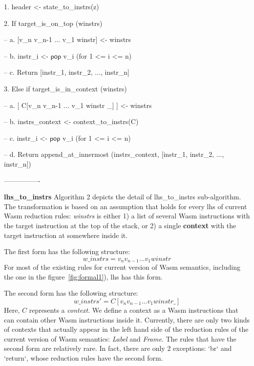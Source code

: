 1. header <- state\_to\_instrs(z)

2. If target\_is\_on\_top (winstrs)

-- a. [v\_n v\_n-1 ... v\_1 winstr] <- winstrs

-- b. instr\_i <- $\mathsf{pop}$ v\_i (for 1 <= i <= n)

-- c. Return [instr\_1, instr\_2, ..., instr\_n]

3. Else if target\_is\_in\_context (winstrs)

-- a. [ C[v\_n v\_n-1 ... v\_1 winstr \_] ] <- winstrs

-- b. instrs\_context <- context\_to\_instrs(C)

-- c. instr\_i <- $\mathsf{pop}$ v\_i (for 1 <= i <= n)

-- d. Return append\_at\_innermost (instrs\_context, [instr\_1, instr\_2, ..., instr\_n])

----------------

\textbf{lhs\_to\_instrs} Algorithm 2 depicts the detail of lhs\_to\_instrs sub-algorithm.
The transformation is based on an assumption that holds for every lhs of current Wasm reduction rules:
\textit{winstrs} is either 1) a list of several Wasm instructions with the target instruction at the top of the stack,
or 2) a single \textbf{context} with the target instruction at somewhere inside it.

The first form has the following structure:
\[
w\_instrs = v_n v_{n-1} ... v_1 winstr
\]
For most of the existing rules for current version of Wasm semantics, including the one in the figure~\ref{fig:formal1}),
lhs has this form.

The second form has the following structure:
\[
w\_instrs' = C[v_n v_{n-1} ... v_1 winstr \_]
\]
Here, $C$ represents a \textit{context}. We define a context as a Wasm instructions that
can contain other Wasm instructions inside it. Currently, there are only two kinds of
contexts that actually appear in the left hand side of the reduction rules of the
current version of Wasm semantics: \textit{Label} and \textit{Frame}.
The rules that have the second form are relatively rare.
In fact, there are only 2 exceptions: `br` and `return`, whose reduction rules
have the second form.

